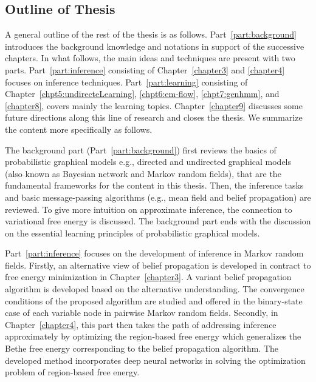 \subsection{Outline of Thesis}

A general outline of the rest of the thesis is as follows. Part~\ref{part:background} introduces the background knowledge and notations in support of the successive chapters. In what follows, the main ideas and techniques are present with two parts. Part~\ref{part:inference} consisting of Chapter~\ref{chapter3} and \ref{chapter4} focuses on inference techniques. Part~\ref{part:learning} consisting of Chapter~\ref{chpt5:undirecteLearning}, \ref{chpt6:em-flow}, \ref{chpt7:genhmm}, and \ref{chapter8}, covers mainly the learning topics. Chapter~\ref{chapter9} discusses some future directions along this line of research and closes the thesis. We summarize the content more specifically as follows.

The background part (Part~\ref{part:background}) first reviews the basics of probabilistic graphical models e.g., directed and undirected graphical models (also known as Bayesian network and Markov random fields), that are the fundamental frameworks for the content in this thesis. Then, the inference tasks and basic message-passing algorithms (e.g., mean field and belief propagation) are reviewed. To give more intuition on approximate inference, the connection to variational free energy is discussed. The background part ends with the discussion on the essential learning principles of probabilistic graphical models.

Part~\ref{part:inference} focuses on the development of inference in Markov random fields. Firstly, an alternative view of belief propagation is developed in contract to free energy minimization in Chapter~\ref{chapter3}. A variant belief propagation algorithm is developed based on the alternative understanding. The convergence conditions of the proposed algorithm are studied and offered in the binary-state case of each variable node in pairwise Markov random fields. Secondly, in Chapter~\ref{chapter4}, this part then takes the path of addressing inference approximately by optimizing the region-based free energy which generalizes the Bethe free energy corresponding to the belief propagation algorithm. The developed method incorporates deep neural networks in solving the optimization problem of region-based free energy.

